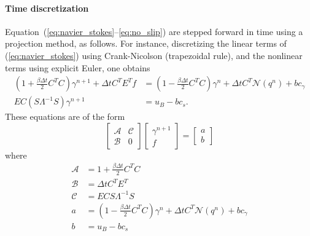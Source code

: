 \documentclass[11pt]{article}
\begin{document}
\paragraph{Time discretization}
Equation~(\ref{eq:navier_stokes}--\ref{eq:no_slip}) are stepped forward in time using a projection method, as follows.  For instance, discretizing the linear terms of (\ref{eq:navier_stokes}) using Crank-Nicolson (trapezoidal rule), and the nonlinear terms using explicit Euler, one obtains
\begin{align}
	\left(1+\frac{\beta\Delta t}{2}C^TC\right)\gamma^{n+1} + \Delta t C^TE^Tf &= \left(1 - \frac{\beta\Delta t}{2}C^TC\right)\gamma^n + \Delta t C^T \mathcal{N}(q^n) + bc_\gamma \label{eq:timestepper}\\
	EC(S\Lambda^{-1}S)\gamma^{n+1} &= u_B - bc_s.
\end{align}
These equations are of the form
\begin{equation}
	\begin{bmatrix}
		\mathcal{A} & \mathcal{C}\\\mathcal{B} & 0
	\end{bmatrix}
	\begin{bmatrix}
		\gamma^{n+1}\\ f
	\end{bmatrix}
	=
	\begin{bmatrix}
		a\\b
	\end{bmatrix}
\label{eq:constrained}
\end{equation}
where
\begin{align}
	\mathcal{A} &= 1 + \frac{\beta\Delta t}{2}C^TC\\
	\mathcal{B} &= \Delta t C^TE^T\\
	\mathcal{C} &= ECS\Lambda^{-1}S\\
	a &= \left(1-\frac{\beta\Delta t}{2}C^TC\right)\gamma^n + \Delta t C^T\mathcal{N}(q^n) + bc_\gamma\\
	b &= u_B - bc_s
\end{align}
\end{document}
